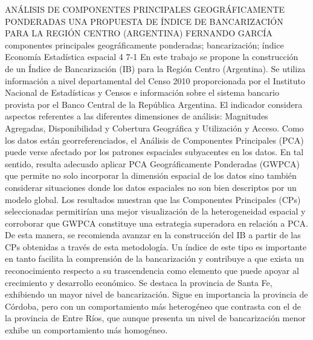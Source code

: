 \A
{ANÁLISIS DE COMPONENTES PRINCIPALES GEOGRÁFICAMENTE PONDERADAS UNA PROPUESTA DE ÍNDICE DE BANCARIZACIÓN PARA LA REGIÓN CENTRO (ARGENTINA)}
{FERNANDO GARCÍA}
{
\\
}
{componentes principales geográficamente ponderadas; bancarización; índice} 
 {Economía} 
 {Estadística espacial} 
 {4} 
 {7-1}
{En este trabajo se propone la construcción de un Índice de Bancarización (IB) para la Región Centro (Argentina). Se utiliza información a nivel departamental del Censo 2010 proporcionada por el Instituto Nacional de Estadísticas y Censos e información sobre el sistema bancario provista por el Banco Central de la República Argentina. El indicador considera aspectos referentes a las diferentes dimensiones de análisis: Magnitudes Agregadas, Disponibilidad y Cobertura Geográfica y Utilización y Acceso. Como los datos están georreferenciados, el Análisis de Componentes Principales (PCA) puede verse afectado por los patrones espaciales subyacentes en los datos. En tal sentido, resulta adecuado aplicar PCA Geográficamente Ponderadas (GWPCA) que permite no solo incorporar la dimensión espacial de los datos sino también considerar situaciones donde los datos espaciales no son bien descriptos por un modelo global. Los resultados muestran que las Componentes Principales (CPs) seleccionadas permitirían una mejor visualización de la heterogeneidad espacial y corroborar que GWPCA constituye una estrategia superadora en relación a PCA. De esta manera, se recomienda avanzar en la construcción del IB a partir de las CPs obtenidas a través de esta metodología. Un índice de este tipo es importante en tanto facilita la comprensión de la bancarización y contribuye a que exista un reconocimiento respecto a su trascendencia como elemento que puede apoyar al crecimiento y desarrollo económico. Se destaca la provincia de Santa Fe, exhibiendo un mayor nivel de bancarización. Sigue en importancia la provincia de Córdoba, pero con un comportamiento más heterogéneo que contrasta con el de la provincia de Entre Ríos, que aunque presenta un nivel de bancarización menor exhibe un comportamiento más homogéneo.}
